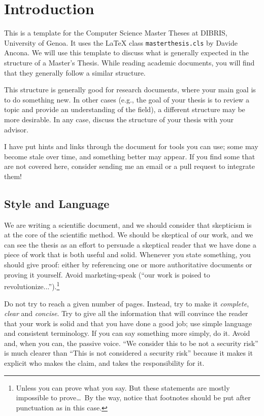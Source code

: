 \chapter{Introduction}
\label{ch:introduction}

This is a template for the Computer Science Master Theses at \ac{DIBRIS},
University of Genoa. It uses the \xspace{\LaTeX} class \texttt{masterthesis.cls} by
Davide Ancona. We will use this template to discuss what is generally expected in the
structure of a Master's Thesis. While reading academic documents, you will find that
they generally follow a similar structure.

This structure is generally good for research documents, where your main goal is to do
something new. In other cases (e.g., the goal of your thesis is to review a topic and provide
an understanding of the field), a different structure may be more desirable. In any case,
discuss the structure of your thesis with your advisor.

I have put hints and links through the document for tools you can use; some may become stale over time, and something better may appear. If you find some that are not covered here, consider sending me an email or a pull request to integrate them!

\section{Style and Language}

We are writing a scientific document, and we should consider that skepticism
is at the core of the scientific method. We should be skeptical of our work, and
we can see the thesis as an effort to persuade a skeptical reader that we have done
a piece of work that is both useful and solid. Whenever you state something, you should give proof:
either by referencing one or more authoritative documents or proving it yourself.
Avoid marketing-speak (``our work is poised to revolutionize...'').\footnote{Unless you can
prove what you say. But these statements are mostly impossible to prove\ldots\ By the
way, notice that footnotes should be put after punctuation as in this case.}

Do not try to reach a given number of pages. Instead, try to make it
\emph{complete}, \emph{clear} and \emph{concise}. Try to give all the information that will
convince the reader that your work is solid and that you have done a good job; use simple
language and consistent terminology.
If you can say something more simply, do it. Avoid
 and, when you can, the passive voice.
``We consider this to be not a security risk'' is much clearer than ``This is not considered a
security risk'' because it makes it explicit who makes the claim, and takes the responsibility for
it.

